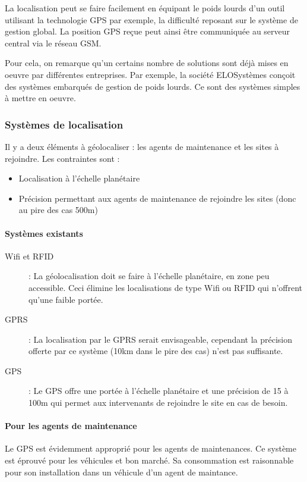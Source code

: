 \documentclass{mise_en_page}
\begin{document}
La localisation peut se faire facilement en équipant le poids lourds
d’un outil utilisant la technologie GPS par exemple, la difficulté
reposant sur le système de gestion global. La position GPS reçue peut
ainsi être communiquée au serveur central via le réseau GSM. 

Pour cela, on remarque qu’un certains nombre de solutions sont déjà
mises en oeuvre par différentes entreprises. Par exemple, la société
ELOSystèmes conçoit des systèmes embarqués de gestion de poids lourds.
Ce sont des systèmes simples à mettre en oeuvre.

\subsubsection{Systèmes de localisation}
Il y a deux éléments à géolocaliser : les agents de maintenance et les
sites à rejoindre. Les contraintes sont :

\begin{itemize}
\item Localisation à l’échelle planétaire
\item Précision permettant aux agents de maintenance de rejoindre les
sites (donc au pire des cas 500m)
\end{itemize}
\paragraph{Systèmes existants}
\begin{description}
\item[Wifi et RFID] : La géolocalisation doit se faire à l’échelle
planétaire, en zone peu accessible. Ceci élimine les localisations de
type Wifi ou RFID qui n’offrent qu’une faible portée.
\item[GPRS] : La localisation par le GPRS serait envisageable, cependant
la précision offerte par ce système (10km dans le pire des cas) n’est
pas suffisante.
\item[GPS] : Le GPS offre une portée à l’échelle planétaire et une
précision de 15 à 100m qui permet aux intervenants de rejoindre le site
en cas de besoin.
\end{description}
\paragraph{Pour les agents de
maintenance}
Le GPS est évidemment approprié pour les agents de maintenances. Ce
système est éprouvé pour les véhicules et bon marché. Sa consommation
est raisonnable pour son installation dans un véhicule d’un agent de
maintance.
\end{document}

